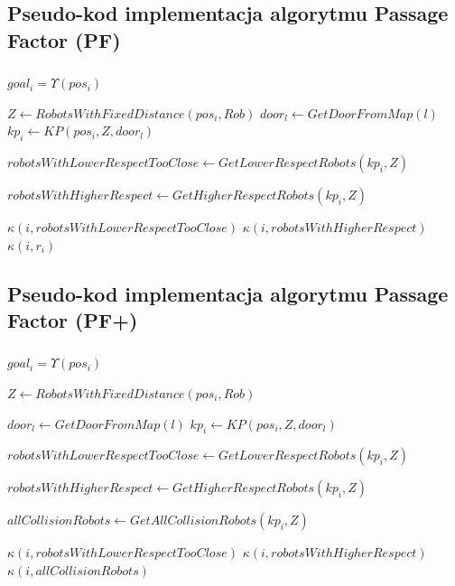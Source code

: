 \documentclass{beamer}
\begin{document}
\subsection{Pseudo-kod implementacja algorytmu Passage Factor (PF)}
\begin{frame}
\frametitle{\subsecname}
\scriptsize{		
	\begin{algorithmic}[1]
		
		\REPEAT
		
		\STATE $ goal_{i} = \Upsilon(pos_{i}) $
		
		\STATE $ Z \gets RobotsWithFixedDistance(pos_{i},Rob) $
		\STATE $ door_{l} \gets GetDoorFromMap(l) $
		\STATE $ kp_{i} \gets KP(pos_{i}, Z, door_{l}) $
		
		\STATE  $ robotsWithLowerRespectTooClose \gets GetLowerRespectRobots(kp_{i},Z) $
		
		\STATE  $ robotsWithHigherRespect \gets GetHigherRespectRobots(kp_{i},Z) $
		
		\STATE	$ \kappa(i, robotsWithLowerRespectTooClose) $ 
		\ELSE			
		\STATE $ \kappa(i, robotsWithHigherRespect) $
		\ELSE	
		\STATE $ \kappa(i, r_{i}) $ 
		\ENDIF
		\ENDIF
		
\end{algorithmic}}
\end{frame}		


\subsection{Pseudo-kod implementacja algorytmu  Passage Factor (PF+)}
\begin{frame}
\frametitle{\subsecname}
\scriptsize{		
\begin{algorithmic}[1]
	\REPEAT
	
	\STATE $ goal_{i} = \Upsilon(pos_{i}) $
	
	\STATE $ Z \gets RobotsWithFixedDistance(pos_{i},Rob) $
	
	\STATE $ door_{l} \gets GetDoorFromMap(l) $
	\STATE $ kp_{i} \gets KP(pos_{i}, Z, door_{l}) $
	
	\STATE  $ robotsWithLowerRespectTooClose \gets GetLowerRespectRobots(kp_{i},Z) $
	
	\STATE  $ robotsWithHigherRespect \gets GetHigherRespectRobots(kp_{i},Z) $
	
	\STATE  $ allCollisionRobots \gets GetAllCollisionRobots(kp_{i},Z) $
	
	\STATE	$ \kappa(i, robotsWithLowerRespectTooClose) $ 
	\ELSE			
	\STATE $ \kappa(i, robotsWithHigherRespect) $
	\ELSE	
	\STATE $ \kappa(i, allCollisionRobots) $ 
	\ENDIF
	\ENDIF
	
\end{algorithmic}}
\end{frame}		
\end{document}
